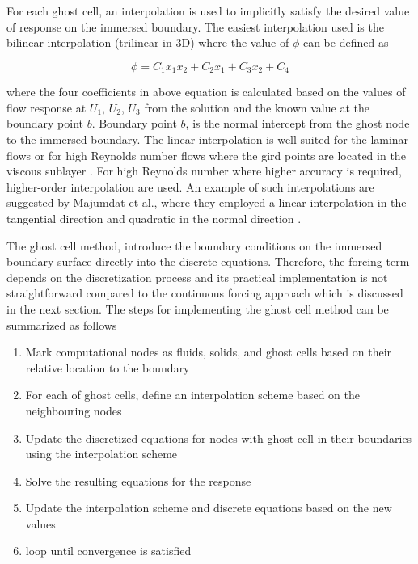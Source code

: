 For each ghost cell, an interpolation is used to implicitly satisfy the desired value of response on the immersed boundary. The easiest interpolation used is the bilinear interpolation (trilinear in 3D) where the value of $\phi$ can be defined as

\begin{equation}
	\phi = C_1 x_1 x_2 + C_2 x_1 + C_3 x_2 + C_4
\end{equation}

where the four coefficients in above equation is calculated based on the values of flow response at $U_1$, $U_2$, $U_3$ from the solution and the known value at the boundary point $b$. Boundary point $b$, is the normal intercept from the ghost node to the immersed boundary. The linear interpolation is well suited for the laminar flows or for high Reynolds number flows where the gird points are located in the viscous sublayer \cite{iaccarino2003immersed}. For high Reynolds number where higher accuracy is required, higher-order interpolation are used. An example of such interpolations are suggested by Majumdat et al., where they employed a linear interpolation in the tangential direction and quadratic in the normal direction \cite{majumdar2001rans}. 

The ghost cell method, introduce the boundary conditions on the immersed boundary surface directly into the discrete equations. Therefore, the forcing term depends on the discretization process and its practical implementation is not straightforward compared to the continuous forcing approach which is discussed in the next section. The steps for implementing the ghost cell method can be summarized as follows

\begin{enumerate}
	\item Mark computational nodes as fluids, solids, and ghost cells based on their relative location to the boundary
	\item For each of ghost cells, define an interpolation scheme based on the neighbouring nodes
	\item Update the discretized equations for nodes with ghost cell in their boundaries using the interpolation scheme
	\item Solve the resulting equations for the response
	\item Update the interpolation scheme and discrete equations based on the new values
	\item loop until convergence is satisfied
\end{enumerate}

